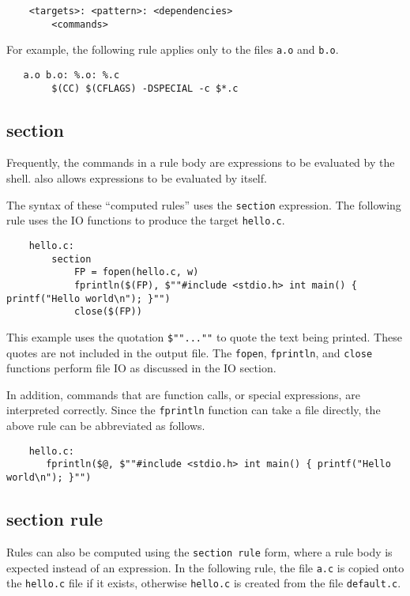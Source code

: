 \begin{verbatim}
    <targets>: <pattern>: <dependencies>
        <commands>
\end{verbatim}

For example, the following rule applies only to the files \verb+a.o+ and \verb+b.o+.

\begin{verbatim}
   a.o b.o: %.o: %.c
        $(CC) $(CFLAGS) -DSPECIAL -c $*.c
\end{verbatim}

\subsection{section}

Frequently, the commands in a rule body are expressions to be evaluated by the shell.  
also allows expressions to be evaluated by  itself.

The syntax of these ``computed rules'' uses the \verb+section+ expression.  The following rule uses
the  IO functions to produce the target \verb+hello.c+.

\begin{verbatim}
    hello.c:
        section
            FP = fopen(hello.c, w)
            fprintln($(FP), $""#include <stdio.h> int main() { printf("Hello world\n"); }"")
            close($(FP))
\end{verbatim}

This example uses the quotation \verb+$""...""+ to quote the text being printed.  These quotes are
not included in the output file.  The \verb+fopen+, \verb+fprintln+, and \verb+close+ functions
perform file IO as discussed in the IO section.

In addition, commands that are function calls, or special expressions, are interpreted correctly.
Since the \verb+fprintln+ function can take a file directly, the above rule can be abbreviated as
follows.

\begin{verbatim}
    hello.c:
       fprintln($@, $""#include <stdio.h> int main() { printf("Hello world\n"); }"")
\end{verbatim}

\subsection{section rule}

Rules can also be computed using the \verb+section rule+ form, where a rule body is expected instead
of an expression.  In the following rule, the file \verb+a.c+ is copied onto the \verb+hello.c+ file
if it exists, otherwise \verb+hello.c+ is created from the file \verb+default.c+.

